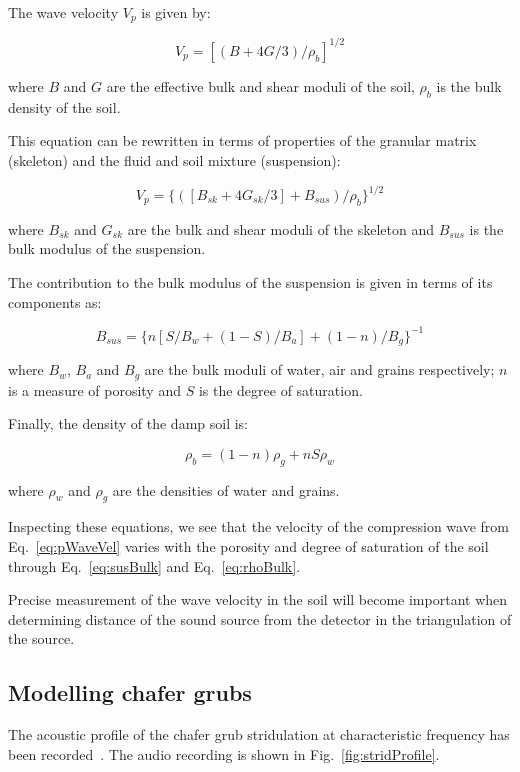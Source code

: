 \documentclass[twocolumn]{article}
\begin{document}
The wave velocity $V_p$ is given by:

\begin{equation}
    V_p = [(B + 4G/3)/\rho_b]^{1/2}
\end{equation}

where $B$ and $G$ are the effective bulk and shear moduli of the soil, $\rho_b$ is the bulk density of the soil.

This equation can be rewritten in terms of properties of the granular matrix (skeleton) and the fluid and soil mixture (suspension):

\begin{equation}
    \label{eq:pWaveVel}
    V_p = \{([B_{sk} + 4G_{sk}/3] + B_{sus})/\rho_b\}^{1/2}
\end{equation}

where $B_{sk}$ and $G_{sk}$ are the bulk and shear moduli of the skeleton and $B_{sus}$ is the bulk modulus of the suspension.

The contribution to the bulk modulus of the suspension is given in terms of its components as:

\begin{equation}
    \label{eq:susBulk}
    B_{sus} = \{n[S/B_w + (1-S)/B_a]+(1-n)/B_g\}^{-1}
\end{equation}

where $B_w$, $B_a$ and $B_g$ are the bulk moduli of water, air and grains respectively; $n$ is a measure of porosity and $S$ is the degree of saturation.

Finally, the density of the damp soil is:

\begin{equation}
    \label{eq:rhoBulk}
    \rho_b = (1-n)\rho_g + nS\rho_w
\end{equation}

where $\rho_w$ and $\rho_g$ are the densities of water and grains.

Inspecting these equations, we see that the velocity of the compression wave from Eq.~\ref{eq:pWaveVel} varies with the porosity and degree of saturation of the soil through Eq.~\ref{eq:susBulk} and Eq.~\ref{eq:rhoBulk}.

Precise measurement of the wave velocity in the soil will become important when determining distance of the sound source from the detector in the triangulation of the source.

\subsection{Modelling chafer grubs}
The acoustic profile of the chafer grub stridulation at characteristic frequency has been recorded~\cite{stridDetect}. The audio recording is shown in Fig.~\ref{fig:stridProfile}.
\end{document}
